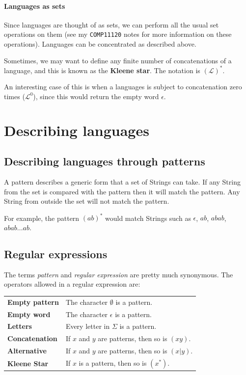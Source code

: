 \paragraph{Languages as sets} Since languages are thought of as sets, we can
perform all the usual set operations on them (see my {\tt COMP11120} notes for
more information on these operations). Languages can be concentrated as
described above.

Sometimes, we may want to define any finite number of concatenations of a
language, and this is known as the {\bf Kleene star}. The notation is
$(\mathcal{L})^*$.

An interesting case of this is when a languages is subject to concatenation zero
times ($\mathcal{L}^0$), since this would return the empty word $\epsilon$.


\section{Describing languages}

\subsection{Describing languages through patterns}

A pattern describes a generic form that a set of Strings can take. If any String
from the set is compared with the pattern then it will match the pattern. Any
String from outside the set will not match the pattern.

For example, the pattern $(ab)^*$ would match Strings such as $\epsilon$, $ab$,
$abab$, $abab \dots ab$.


\subsection{Regular expressions}

The terms {\it pattern} and {\it regular expression} are pretty much synonymous.
The operators allowed in a regular expression are:

\begin{center}
	\begin{tabular}{>{\bfseries} l l}
		Empty pattern & The character $\emptyset$ is a pattern.\\
		Empty word & The character $\epsilon$ is a pattern.\\
		Letters & Every letter in $\Sigma$ is a pattern.\\
		\rowcolor{Gray}
		Concatenation & If $x$ and $y$ are patterns, then so is $(xy)$.\\
		\rowcolor{Gray}
		Alternative & If $x$ and $y$ are patterns, then so is $(x|y)$.\\
		\rowcolor{Gray}
		Kleene Star & If $x$ is a pattern, then so is $(x^*)$.
	\end{tabular}
\end{center}

